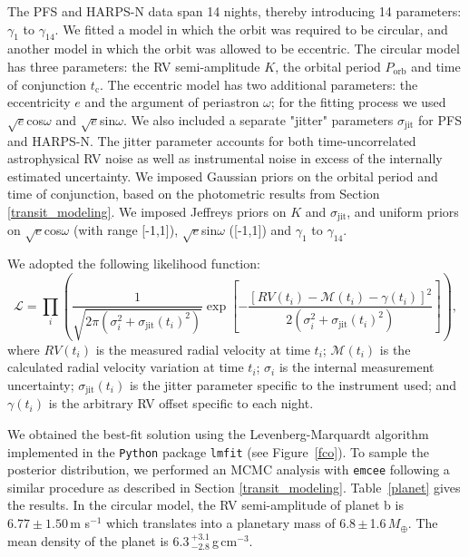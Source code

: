 \documentclass[twocolumn]{aastex61}
\begin{document}
The PFS and HARPS-N data span 14 nights, thereby introducing 14 parameters: $\gamma_1$ to $\gamma_{14}$.
We fitted a model in which the orbit was required to be circular,
and another model in which the orbit was allowed to be eccentric.
The circular model has three parameters: the RV semi-amplitude $K$, the orbital period $P_{\text{orb}}$ and time of conjunction $t_{\text{c}}$. The eccentric model has two additional parameters: the eccentricity $e$ and the argument of periastron $\omega$; for the fitting process we used
$\sqrt{e}$cos$\omega$ and $\sqrt{e}$sin$\omega$.
We also included a separate "jitter" parameters $\sigma_{\text{jit}}$ for PFS and HARPS-N. The jitter parameter accounts for both time-uncorrelated astrophysical RV noise as well as instrumental noise in excess
of the internally estimated uncertainty. We imposed Gaussian priors on the orbital period and time of conjunction, based on the photometric results from Section \ref{transit_modeling}. We imposed Jeffreys priors on $K$ and $\sigma_{\text{jit}}$, and uniform priors on $\sqrt{e}$cos$\omega$ (with range [-1,1]), $\sqrt{e}$sin$\omega$ ([-1,1]) and $\gamma_1$ to $\gamma_{14}$.

We adopted the following likelihood function:
\begin{equation}\label{rv_likelihood}
\mathcal{L}=  \prod_{i}\left({\frac{1}{\sqrt{2 \pi (\sigma_i^2 + \sigma_{\text{jit}}(t_i)^2)}}}  \exp \left[ - \frac{[RV(t_i) - \mathcal{M}(t_i)-\gamma(t_i)]^2}{2 (\sigma_i^2 + \sigma_{\text{jit}}(t_i)^2)} \right] \right),
\end{equation}
where $RV(t_i)$ is the measured radial velocity at time $t_i$; $\mathcal{M}(t_i)$ is the calculated radial velocity variation at time $t_i$; $\sigma_{i}$ is the internal measurement uncertainty; $\sigma_{\text{jit}}(t_i)$ is the jitter parameter specific to the instrument used;
and $\gamma(t_i)$ is the arbitrary RV offset specific to each night.

We obtained the best-fit solution using the Levenberg-Marquardt algorithm implemented in the {\tt Python} package {\tt lmfit} (see Figure~\ref{fco}). To sample the posterior distribution, we performed an MCMC analysis with {\tt emcee} following a similar procedure as described in Section \ref{transit_modeling}.
Table~\ref{planet} gives the results. In the circular model, the RV semi-amplitude of planet b is $6.77 \pm 1.50$\,m s$^{-1}$ which translates into a planetary mass of 6.8\,$\pm$\,1.6\,$M_{\oplus}$. The mean density of the planet is 6.3\,$^{+3.1}_{-2.8}$\,g\,cm$^{-3}$. 
\end{document}
